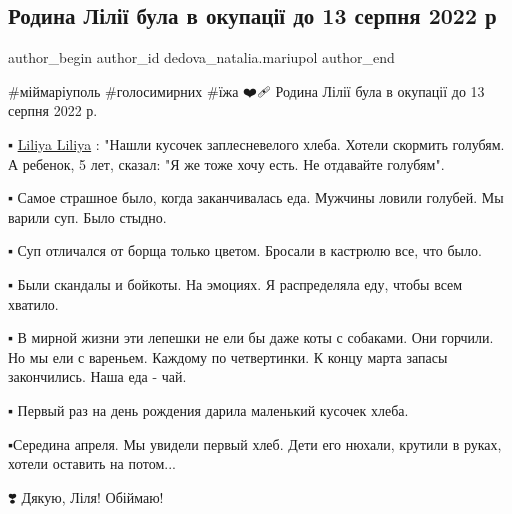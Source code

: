  
 
 
 
 

\subsection{Родина Лілії була в окупації до 13 серпня 2022 р}
\label{sec:27_01_2023.fb.dedova_natalia.mariupol.2.rodina_l_l__bula_v_}

\ifcmt
 author_begin
   author_id dedova_natalia.mariupol
 author_end
\fi

\#міймаріуполь
\#голосимирних
\#їжа
❤️🩹 Родина Лілії була в окупації до 13 серпня 2022 р. 

▪️ \href{https://www.facebook.com/liliya.dmitrishena}{Liliya Liliya} : "Нашли кусочек заплесневелого хлеба. Хотели скормить голубям.
А ребенок, 5 лет, сказал: "Я же тоже хочу есть. Не отдавайте голубям". 

▪️ Самое страшное было, когда заканчивалась еда. Мужчины ловили голубей. Мы
варили суп. Было стыдно. 

▪️ Суп отличался от борща только цветом. Бросали в кастрюлю все, что было. 

▪️ Были скандалы и бойкоты. На эмоциях. Я распределяла еду, чтобы всем хватило. 

▪️ В мирной жизни эти лепешки не ели бы даже коты с собаками. Они горчили. Но мы
ели с вареньем. Каждому по четвертинки. К концу марта запасы закончились. Наша
еда - чай. 

▪️ Первый раз на день рождения дарила маленький кусочек хлеба.

▪️Середина апреля. Мы увидели первый хлеб. Дети его нюхали, крутили в руках,
хотели оставить на потом... 

❣️ Дякую, Ліля! Обіймаю!


